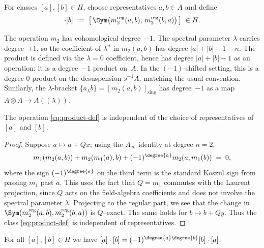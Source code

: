 \begin{definition}%
For classes $[a],[b]\in H$, choose representatives $a,b\in A$ and define
\begin{equation}%
[a]\cdot [b] \;:=\; \big[\, \Sym\big(m_2^{\mathrm{reg}}(a,b),\, m_2^{\mathrm{reg}}(b,a)\big)\,\big] \;\in H.
\end{equation}
\end{definition}

\begin{remark}%
The operation $m_2$ has cohomological degree~$-1$. The spectral parameter $\lambda$ carries degree~$+1$, so the coefficient of $\lambda^n$ in $m_2(a,b)$ has degree $|a|+|b|-1-n$. The product is defined via the $\lambda = 0$ coefficient, hence has degree $|a|+|b|-1$ as an operation: it is a degree~$-1$ product on~$A$. In the $(-1)$-shifted setting, this is a degree-$0$ product on the desuspension $s^{-1}A$, matching the usual convention. Similarly, the $\lambda$-bracket $\{a_\lambda b\} = [m_2(a,b)]_{\mathrm{sing}}$ has degree~$-1$ as a map $A \otimes A \to A((\lambda))$.
\end{remark}

\begin{lemma}%
The operation \eqref{eq:product-def} is independent of the choice of representatives of $[a]$ and $[b]$.
\end{lemma}

\begin{proof}
Suppose $a\mapsto a+Qx$; using the $A_\infty$ identity at degree $n=2$,
\[
m_1(m_2(a,b)) + m_2(m_1(a),b) + (-1)^{\degree{a}} m_2(a, m_1(b)) \;=\; 0,
\]
where the sign $(-1)^{\degree{a}}$ on the third term is the standard Koszul sign from passing $m_1$ past $a$. This uses the fact that $Q = m_1$ commutes with the Laurent projection, since $Q$ acts on the field-algebra coefficients and does not involve the spectral parameter $\lambda$. Projecting to the regular part, we see that the change in $\Sym(m_2^{\mathrm{reg}}(a,b),m_2^{\mathrm{reg}}(b,a))$ is $Q$–exact. The same holds for $b\mapsto b+Qy$. Thus the class \eqref{eq:product-def} is independent of representatives.
\end{proof}

\begin{lemma}%
For all $[a],[b]\in H$ we have $[a]\cdot [b] = (-1)^{\degree{a}\degree{b}} [b]\cdot [a]$.
\end{lemma}

